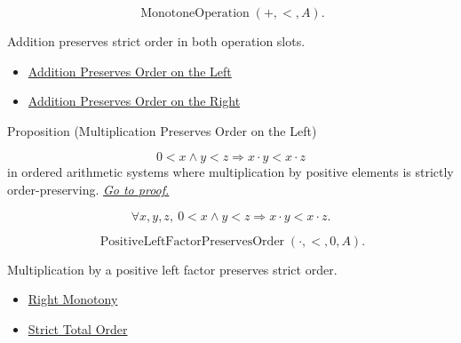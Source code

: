\begin{remark*}
\[
\operatorname{MonotoneOperation}(+,<,A).
\]
\end{remark*}

\begin{remark*}[Interpretation]
Addition preserves strict order in both operation slots.
\end{remark*}

\begin{dependencies}
\begin{itemize}
  \item \hyperref[prop:addition-order-compatibility-left]{Addition Preserves Order on the Left}
  \item \hyperref[prop:addition-order-compatibility-right]{Addition Preserves Order on the Right}
\end{itemize}
\end{dependencies}

\begin{propositionbox}{Proposition (Multiplication Preserves Order on the Left)}
\begin{proposition}
\label{prop:multiplication-order-compatibility-left}
\[
0<x \land y<z \Longrightarrow x\cdot y<x\cdot z
\]
in ordered arithmetic systems where multiplication by positive elements is
strictly order-preserving.
\hyperref[prf:multiplication-order-compatibility-left]{\textit{Go to proof.}}
\end{proposition}
\end{propositionbox}

\begin{remark*}
\[
\forall x,y,z,\ 0<x \land y<z \Longrightarrow x\cdot y<x\cdot z.
\]
\end{remark*}

\begin{remark*}
\[
\operatorname{PositiveLeftFactorPreservesOrder}(\cdot,<,0,A).
\]
\end{remark*}

\begin{remark*}[Interpretation]
Multiplication by a positive left factor preserves strict order.
\end{remark*}

\begin{dependencies}
\begin{itemize}
  \item \hyperref[def:right-monotony]{Right Monotony}
  \item \hyperref[def:strict-total-order]{Strict Total Order}
\end{itemize}
\end{dependencies}

